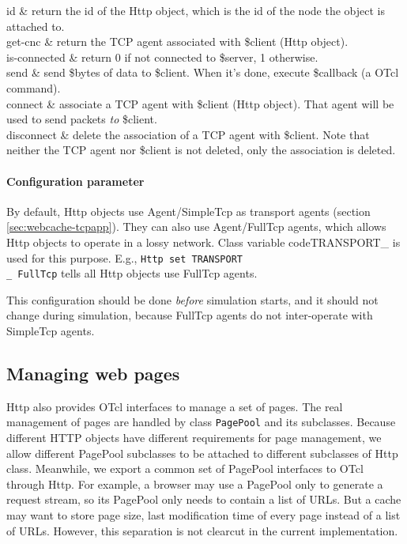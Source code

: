 \begin{\par\tabular{\textwidth}{rX}}
id & return the id of the Http object, which is the id of the node the object
is attached to. \\

get-cnc  & return the TCP agent associated with \$client (Http object).\\

is-connected  & return 0 if not connected to \$server, 1 otherwise.\\

send    & send \$bytes of data to 
\$client. When it's done, execute \$callback (a OTcl command). \\

connect   & associate a TCP agent with \$client (Http object). That agent will be used to send packets \emph{to} \$client. \\

disconnect  & delete the association of a TCP agent with \$client.
Note that neither the TCP agent nor \$client is not deleted, only the 
association is deleted.\\
\end{\par\tabular{\textwidth}{rX}}

\paragraph{Configuration parameter}

By default, Http objects use Agent/SimpleTcp as transport agents
(section \ref{sec:webcache-tcpapp}). They can also use Agent/FullTcp
agents, which allows Http objects to operate in a lossy network.
Class variable code{TRANSPORT\_} is used for this purpose. E.g.,
{\tt Http set TRANSPORT\\_ FullTcp} tells all Http objects use
FullTcp agents.

This configuration should be done \emph{before} simulation starts, and 
it should not change during simulation, because FullTcp agents do not 
inter-operate with SimpleTcp agents.

\subsection{Managing web pages}
\label{sec:webcache-page}

Http also provides OTcl interfaces to manage a set of pages. The 
real management of pages are handled by class {\tt PagePool} and its
subclasses. Because different HTTP objects have different requirements
for page management, we allow different PagePool subclasses to be attached
to different subclasses of Http class. Meanwhile, we export
a common set of PagePool interfaces to OTcl through
Http. For example, a browser may use a PagePool only to generate a 
request stream, so its PagePool only needs to contain a list of URLs. But
a cache may want to store page size, last modification time of every page 
instead of a list of URLs. However, this separation is not clearcut in 
the current implementation. 

